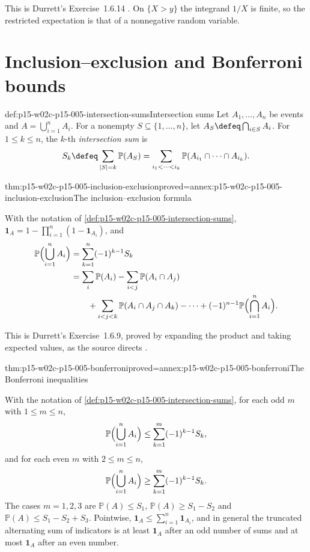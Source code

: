 This is Durrett's Exercise~1.6.14 \cite[p.~37]{DurrettPTEAuthor2019}.
On \(\{X>y\}\) the integrand \(1/X\) is finite, so the restricted
expectation is that of a nonnegative random variable.

\section{Inclusion--exclusion and Bonferroni bounds}
\label{sec:p15-w02c-p15-005-bonferroni}

\begin{hbdefinition}{def:p15-w02c-p15-005-intersection-sums}{Intersection sums}
Let \(A_1,\ldots,A_n\) be events and \(A=\bigcup_{i=1}^nA_i\). For a
nonempty \(S\subseteq\{1,\ldots,n\}\), let
\(A_S\defeq\bigcap_{i\in S}A_i\). For \(1\leq k\leq n\), the
\(k\)-th \emph{intersection sum} is
\[
 S_k\defeq\sum_{|S|=k}\mathbb P(A_S)
 =\sum_{i_1<\cdots<i_k}\mathbb P(A_{i_1}\cap\cdots\cap A_{i_k}).
\]
\end{hbdefinition}

\begin{hbtheorem}{thm:p15-w02c-p15-005-inclusion-exclusion}{proved=annex:p15-w02c-p15-005-inclusion-exclusion}{The inclusion--exclusion formula}
\par\nobreak
With the notation of \cref{def:p15-w02c-p15-005-intersection-sums},
\(\mathbf1_A=1-\prod_{i=1}^n(1-\mathbf1_{A_i})\), and
\[
 \begin{aligned}
 \mathbb P\Bigl(\bigcup_{i=1}^nA_i\Bigr)
 &=\sum_{k=1}^n(-1)^{k-1}S_k\\
 &=\sum_i\mathbb P(A_i)-\sum_{i<j}\mathbb P(A_i\cap A_j)\\
 &\qquad+\sum_{i<j<k}\mathbb P(A_i\cap A_j\cap A_k)-\cdots
  +(-1)^{n-1}\mathbb P\Bigl(\bigcap_{i=1}^nA_i\Bigr).
 \end{aligned}
\]
\end{hbtheorem}

This is Durrett's Exercise~1.6.9, proved by expanding the product and
taking expected values, as the source directs
\cite[p.~36]{DurrettPTEAuthor2019}.

\begin{hbtheorem}{thm:p15-w02c-p15-005-bonferroni}{proved=annex:p15-w02c-p15-005-bonferroni}{The Bonferroni inequalities}
\par\nobreak
With the notation of \cref{def:p15-w02c-p15-005-intersection-sums},
for each odd \(m\) with \(1\leq m\leq n\),
\[
 \mathbb P\Bigl(\bigcup_{i=1}^nA_i\Bigr)\leq\sum_{k=1}^m(-1)^{k-1}S_k ,
\]
and for each even \(m\) with \(2\leq m\leq n\),
\[
 \mathbb P\Bigl(\bigcup_{i=1}^nA_i\Bigr)\geq\sum_{k=1}^m(-1)^{k-1}S_k .
\]
The cases \(m=1,2,3\) are
\(\mathbb P(A)\leq S_1\), \(\mathbb P(A)\geq S_1-S_2\) and
\(\mathbb P(A)\leq S_1-S_2+S_3\). Pointwise,
\(\mathbf1_A\leq\sum_{i=1}^n\mathbf1_{A_i}\), and in general the
truncated alternating sum of indicators is at least \(\mathbf1_A\)
after an odd number of sums and at most \(\mathbf1_A\) after an even
number.
\end{hbtheorem}

